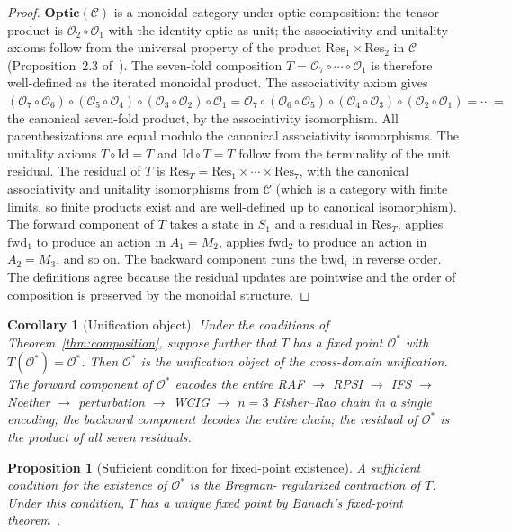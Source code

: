 \documentclass[11pt,a4paper]{article}
\theoremstyle{plain}
\newtheorem{proposition}[theorem]{Proposition}
\newtheorem{corollary}[theorem]{Corollary}
\theoremstyle{definition}
\theoremstyle{remark}
\newcommand{\OO}{\mathcal{O}}
\newcommand{\CC}{\mathcal{C}}
\newcommand{\Optic}{\mathbf{Optic}}
\begin{document}
\begin{proof}[Proof]
$\Optic(\CC)$ is a monoidal category under optic composition: the
tensor product is $\OO_2\circ\OO_1$ with the identity optic as unit;
the associativity and unitality axioms follow from the universal
property of the product $\mathrm{Res}_1\times\mathrm{Res}_2$ in $\CC$
(Proposition~2.3 of~\cite{riley2018optics}).
The seven-fold composition $T=\OO_7\circ\cdots\circ\OO_1$ is therefore
well-defined as the iterated monoidal product. The associativity axiom
gives
$(\OO_7\circ\OO_6)\circ(\OO_5\circ\OO_4)\circ(\OO_3\circ\OO_2)\circ\OO_1
= \OO_7\circ(\OO_6\circ\OO_5)\circ(\OO_4\circ\OO_3)\circ(\OO_2\circ\OO_1)
= \cdots = $ the canonical seven-fold product, by the associativity
isomorphism. All parenthesizations are equal modulo the canonical
associativity isomorphisms. The unitality axioms $T\circ\mathrm{Id}=T$
and $\mathrm{Id}\circ T=T$ follow from the terminality of the unit
residual. The residual of $T$ is $\mathrm{Res}_T=\mathrm{Res}_1\times
\cdots\times\mathrm{Res}_7$, with the canonical associativity and
unitality isomorphisms from $\CC$ (which is a category with finite
limits, so finite products exist and are well-defined up to canonical
isomorphism). The forward component of $T$ takes a state in
$S_1$ and a residual in $\mathrm{Res}_T$, applies $\mathrm{fwd}_1$ to
produce an action in $A_1 = M_2$, applies $\mathrm{fwd}_2$ to produce
an action in $A_2 = M_3$, and so on. The backward component runs the
$\mathrm{bwd}_i$ in reverse order. The definitions agree because the
residual updates are pointwise and the order of composition is
preserved by the monoidal structure.
\end{proof}

\begin{corollary}[Unification object]\label{cor:unification}
Under the conditions of Theorem~\ref{thm:composition}, suppose further
that $T$ has a fixed point $\OO^*$ with $T(\OO^*)=\OO^*$. Then $\OO^*$
is the unification object of the cross-domain unification. The forward
component of $\OO^*$ encodes the entire RAF $\to$ RPSI $\to$ IFS $\to$
Noether $\to$ perturbation $\to$ WCIG $\to$ $n=3$ Fisher--Rao chain in
a single encoding; the backward component decodes the entire chain; the
residual of $\OO^*$ is the product of all seven residuals.
\end{corollary}

\begin{proposition}[Sufficient condition for fixed-point existence]
\label{prop:sufficient}
A sufficient condition for the existence of $\OO^*$ is the Bregman-
regularized contraction of $T$. Under this condition, $T$ has a unique
fixed point by Banach's fixed-point theorem~\cite{banach1922}.
\end{proposition}
\end{document}
